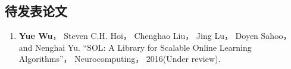 \documentclass[doctor]{ustcthesis}
\begin{document}
\begin{publications}
    \section*{待发表论文}
    \begin{enumerate}
        \item \textbf{Yue Wu}， Steven C.H. Hoi， Chenghao Liu， Jing Lu， Doyen Sahoo，
            and Nenghai Yu. “SOL: A Library for Scalable Online Learning
            Algorithms”， Neurocomputing， 2016(Under review).
    \end{enumerate}

\end{publications}
\end{document}

